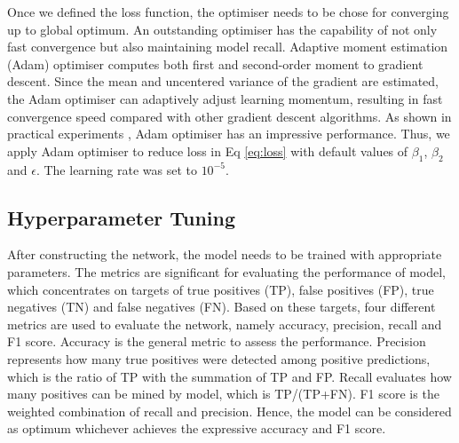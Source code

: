 Once we defined the loss function, the optimiser needs to be chose for converging up to global optimum. An outstanding optimiser has the capability of not only fast convergence but also maintaining model recall. Adaptive moment estimation (Adam) optimiser \cite{kingma2014adam} computes both first and second-order moment to gradient descent. Since the mean and uncentered variance of the gradient are estimated, the Adam optimiser can adaptively adjust learning momentum, resulting in fast convergence speed compared with other gradient descent algorithms. As shown in practical experiments \cite{ruder2016overview}, Adam optimiser has an impressive performance. Thus, we apply Adam optimiser to reduce loss in Eq \ref{eq:loss} with default values of $\beta_1$, $\beta_2$ and $\epsilon$. The learning rate was set to $10^{-5}$. 
\subsection{Hyperparameter Tuning}
After constructing the network, the model needs to be trained with appropriate parameters. The metrics are significant for evaluating the performance of model, which concentrates on targets of true positives (TP), false positives (FP), true negatives (TN) and false negatives (FN). Based on these targets, four different metrics are used to evaluate the network, namely accuracy, precision, recall and F1 score. Accuracy is the general metric to assess the performance. Precision represents how many true positives were detected among positive predictions, which is the ratio of TP with the summation of TP and FP. Recall evaluates how many positives can be mined by model, which is TP/(TP+FN). F1 score is the weighted combination of recall and precision. Hence, the model can be considered as optimum whichever achieves the expressive accuracy and F1 score.

